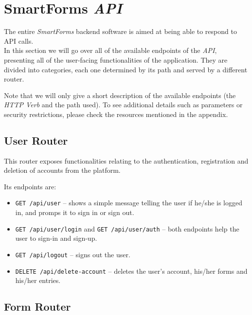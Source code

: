 \documentclass[11pt, a4paper]{report}
\def\code#1{\texttt{#1}}
\begin{document}
\section{SmartForms \textit{API}}

The entire \textit{SmartForms} backend software is aimed at being able to respond to API calls.\\
In this section we will go over all of the available endpoints of the \textit{API}, presenting all of the user-facing functionalities of the application. They are divided into categories, each one determined by its path and served by a different router.

Note that we will only give a short description of the available endpoints (the \textit{HTTP Verb} and the path used). To see additional details such as parameters or security restrictions, please check the resources mentioned in the appendix.

\subsection{User Router}

This router exposes functionalities relating to the authentication, registration and deletion of accounts from the platform.

Its endpoints are:
\begin{itemize}
    \item \code{GET /api/user} -- shows a simple message telling the user if he/she is logged in, and promps it to sign in or sign out.
    \item \code{GET /api/user/login} and \code{GET /api/user/auth} -- both endpoints help the user to sign-in and sign-up.
    \item \code{GET /api/logout} -- signs out the user.
    \item \code{DELETE /api/delete-account} -- deletes the user's account, his/her forms and his/her entries.
\end{itemize}

\subsection{Form Router}
\end{document}
